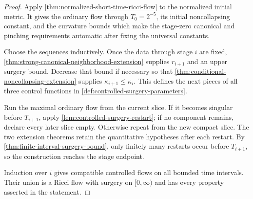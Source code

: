 \begin{proof}
Apply \ref{thm:normalized-short-time-ricci-flow} to the normalized initial
metric.  It gives the ordinary flow through $T_0=2^{-5}$, its initial
noncollapsing constant, and the curvature bounds which make the stage-zero
canonical and pinching requirements automatic after fixing the universal
constants.

Choose the sequences inductively.  Once the data through stage $i$ are fixed,
\ref{thm:strong-canonical-neighborhood-extension} supplies $r_{i+1}$ and an
upper surgery bound.  Decrease that bound if necessary so that
\ref{thm:conditional-noncollapsing-extension} supplies
$\kappa_{i+1}\le\kappa_i$.  This defines the next pieces of all three
control functions in \ref{def:controlled-surgery-parameters}.

Run the maximal ordinary flow from the current slice.  If it becomes singular
before $T_{i+1}$, apply \ref{lem:controlled-surgery-restart}; if no component
remains, declare every later slice empty.  Otherwise repeat from the new
compact slice.  The two extension theorems retain the quantitative hypotheses
after each restart.  By \ref{thm:finite-interval-surgery-bound}, only finitely
many restarts occur before $T_{i+1}$, so the construction reaches the stage
endpoint.

Induction over $i$ gives compatible controlled flows on all bounded time
intervals.  Their union is a Ricci flow with surgery on $[0,\infty)$ and has
every property asserted in the statement.
\end{proof}
